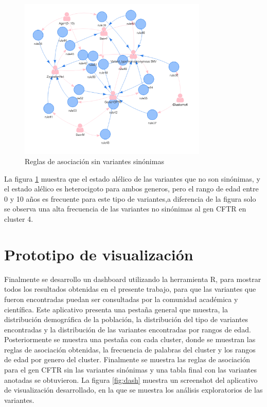 \begin{figure}[H]
	\centering
	\includegraphics[width=0.8\textwidth]{Kap4/CFTR2}
	\caption{Reglas de asociación sin variantes sinónimas} \label{fig:re6}
\end{figure}

La figura \ref{fig:re6} muestra que el estado alélico de las variantes que no son sinónimas, y el estado alélico es heterocigoto para ambos generos, pero el rango de edad entre 0 y 10 años es frecuente para este tipo de variantes,a diferencia de la figura \label{fig:r6} solo se observa una alta frecuencia de las variantes no sinónimas al gen CFTR en cluster 4.  

\section{Prototipo de visualización}

Finalmente se desarrollo un dashboard utilizando la herramienta R, para mostrar todos los resultados obtenidas en el presente trabajo, para que las variantes que fueron encontradas puedan ser consultadas por la comunidad académica y científica. Este aplicativo presenta una pestaña general que muestra, la distribución demográfica de la población, la distribución del tipo de variantes encontradas y la distribución de las variantes encontradas por rangos de edad. Posteriormente se muestra una pestaña con cada cluster, donde se muestran las reglas de asociación obtenidas, la frecuencia de palabras del cluster y los rangos de edad por genero del cluster. Finalmente se muestra las reglas de asociación para el gen CFTR sin las variantes sinónimas y una tabla final con las variantes anotadas se obtuvieron. La figura \ref{fig:dash} muestra un screenshot  del aplicativo de visualización desarrollado, en la que se muestra los análisis exploratorios de las variantes.

